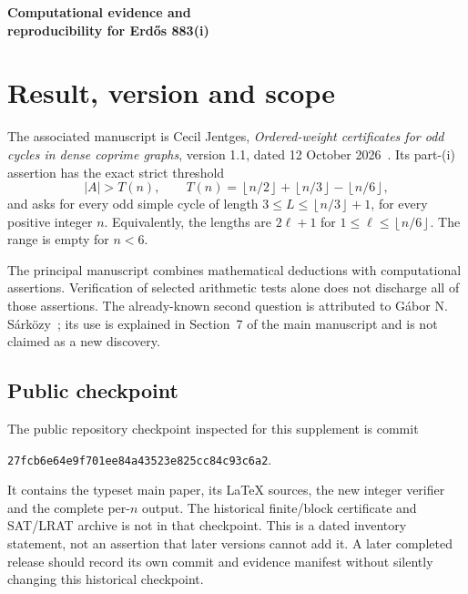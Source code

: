 \documentclass[11pt,letterpaper]{article}
\theoremstyle{remark}\newtheorem{remark}[theorem]{Remark}
\newcommand{\floor}[1]{\left\lfloor#1\right\rfloor}
\newcommand{\dochead}[3]{\begin{center}{\LARGE\bfseries #1\par}\vspace{10pt}{\large Cecil Jentges\par}\vspace{3pt}{\small Independent researcher\par}\vspace{6pt}{\small #2\par}\vspace{3pt}{\small #3\par}\end{center}}
\begin{document}
\dochead{Computational evidence and\\[3pt]reproducibility for Erd\H{o}s 883(i)}{A companion to the ordered-weight manuscript}{12 October 2026 (UTC), version 1.0}
\begin{abstract}
This supplement maps a computer-assisted proof candidate to its structural arguments, finite certificates and analytic estimates. It distinguishes public files, reported historical computations, fresh bounded checks, and mathematical review. It documents the supplied integer-only replay over 4,000 through 30,000 and the separate evidence still needed for the full application. This is an evidence guide, not a replacement for the certificate archive or a new independent proof.
\end{abstract}

\section{Result, version and scope}
The associated manuscript is Cecil Jentges, \emph{Ordered-weight certificates for odd cycles in dense coprime graphs}, version 1.1, dated 12 October 2026~\cite{paper}. Its part-(i) assertion has the exact strict threshold
\[
 |A|>T(n),\qquad T(n)=\floor{n/2}+\floor{n/3}-\floor{n/6},
\]
and asks for every odd simple cycle of length $3\le L\le\floor{n/3}+1$, for every positive integer $n$. Equivalently, the lengths are $2\ell+1$ for $1\le\ell\le\floor{n/6}$. The range is empty for $n<6$.

The principal manuscript combines mathematical deductions with computational assertions. Verification of selected arithmetic tests alone does not discharge all of those assertions. The already-known second question is attributed to G\'abor N. S\'ark\"ozy~\cite{sarkozy}; its use is explained in Section~7 of the main manuscript and is not claimed as a new discovery.

\subsection*{Public checkpoint}
The public repository checkpoint inspected for this supplement is commit
\begin{center}\small\texttt{27fcb6e64e9f701ee84a43523e825cc84c93c6a2}.\end{center}
It contains the typeset main paper, its LaTeX sources, the new integer verifier and the complete per-$n$ output. The historical finite/block certificate and SAT/LRAT archive is not in that checkpoint. This is a dated inventory statement, not an assertion that later versions cannot add it. A later completed release should record its own commit and evidence manifest without silently changing this historical checkpoint.
\end{document}
